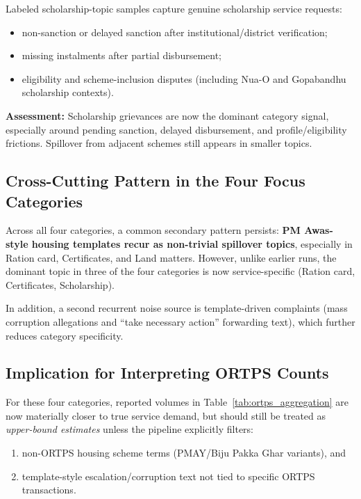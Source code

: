 \documentclass[11pt,a4paper]{article}
\begin{document}
Labeled scholarship-topic samples capture genuine scholarship service requests:
\begin{itemize}
    \item non-sanction or delayed sanction after institutional/district verification;
    \item missing instalments after partial disbursement;
    \item eligibility and scheme-inclusion disputes (including Nua-O and Gopabandhu scholarship contexts).
\end{itemize}

\textbf{Assessment:} Scholarship grievances are now the dominant category signal, especially around pending sanction, delayed disbursement, and profile/eligibility frictions. Spillover from adjacent schemes still appears in smaller topics.

\subsection{Cross-Cutting Pattern in the Four Focus Categories}

Across all four categories, a common secondary pattern persists: \textbf{PM Awas-style housing templates recur as non-trivial spillover topics}, especially in Ration card, Certificates, and Land matters. However, unlike earlier runs, the dominant topic in three of the four categories is now service-specific (Ration card, Certificates, Scholarship).

In addition, a second recurrent noise source is template-driven complaints (mass corruption allegations and ``take necessary action'' forwarding text), which further reduces category specificity.

\subsection{Implication for Interpreting ORTPS Counts}

For these four categories, reported volumes in Table~\ref{tab:ortps_aggregation} are now materially closer to true service demand, but should still be treated as \emph{upper-bound estimates} unless the pipeline explicitly filters:
\begin{enumerate}
    \item non-ORTPS housing scheme terms (PMAY/Biju Pakka Ghar variants), and
    \item template-style escalation/corruption text not tied to specific ORTPS transactions.
\end{enumerate}
\end{document}
